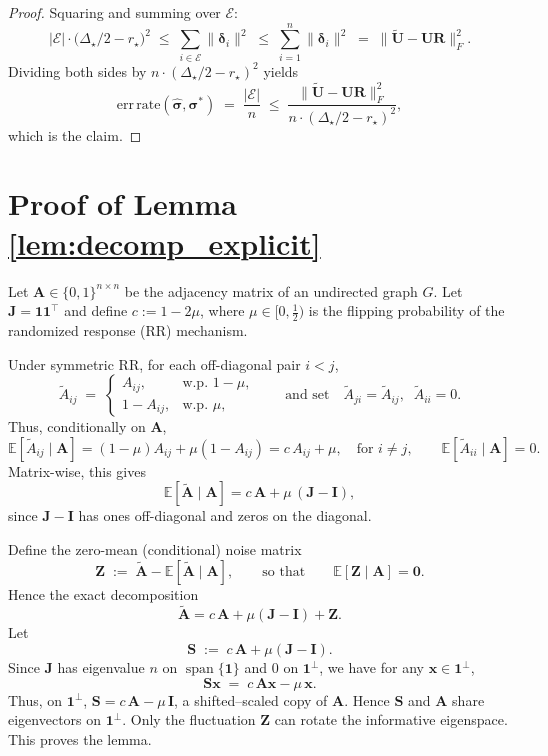 \documentclass[11pt]{article}
\theoremstyle{plain}
\theoremstyle{definition}
\theoremstyle{remark}
\begin{document}
\begin{proof}
Squaring and summing over $\mathcal{E}$:
\[
|\mathcal{E}| \cdot \bigl(\Delta_\star/2 - r_\star\bigr)^2
\;\leq\; \sum_{i \in \mathcal{E}} \|\bm\delta_i\|^2
\;\leq\; \sum_{i=1}^n \|\bm\delta_i\|^2
\;=\; \|\widetilde{\mathbf{U}} - \mathbf{U}\mathbf{R}\|_F^2.
\]
Dividing both sides by $n \cdot (\Delta_\star/2 - r_\star)^2$ yields
\[
\mathrm{err\,rate}(\hat{\bm\sigma}, \bm\sigma^\ast)
\;=\; \frac{|\mathcal{E}|}{n}
\;\leq\; \frac{\|\widetilde{\mathbf{U}} - \mathbf{U}\mathbf{R}\|_F^2}{n \cdot (\Delta_\star/2 - r_\star)^2},
\]
which is the claim.
\end{proof}



\section{Proof of Lemma \ref{lem:decomp_explicit}}

Let $\mathbf{A}\in\{0,1\}^{n\times n}$ be the adjacency matrix of an undirected graph $G$. Let $\mathbf{J}=\mathbf{1}\mathbf{1}^\top$ and define $c:=1-2\mu$, where $\mu\in[0,\tfrac12)$ is the flipping probability of the randomized response (RR) mechanism.

Under symmetric RR, for each off-diagonal pair $i<j$,
\[
\widetilde{A}_{ij} \;=\;
\begin{cases}
A_{ij}, & \text{w.p. } 1-\mu,\\
1-A_{ij}, & \text{w.p. } \mu,
\end{cases}
\qquad\text{and set}\quad \widetilde{A}_{ji}=\widetilde{A}_{ij},\;\; \widetilde{A}_{ii}=0.
\]
Thus, conditionally on $\mathbf{A}$,
\[
\mathbb{E}[\widetilde{A}_{ij}\mid \mathbf{A}]
= (1-\mu)A_{ij} + \mu(1-A_{ij})
= c\,A_{ij} + \mu,
\quad \text{for } i\neq j,
\qquad
\mathbb{E}[\widetilde{A}_{ii}\mid \mathbf{A}] = 0.
\]
Matrix-wise, this gives
\[
\mathbb{E}[\widetilde{\mathbf{A}}\mid \mathbf{A}]
= c\,\mathbf{A} + \mu\,(\mathbf{J}-\mathbf{I}),
\]
since $\mathbf{J}-\mathbf{I}$ has ones off-diagonal and zeros on the diagonal.

Define the zero-mean (conditional) noise matrix
\[
\mathbf{Z} \;:=\; \widetilde{\mathbf{A}} - \mathbb{E}[\widetilde{\mathbf{A}}\mid \mathbf{A}],
\qquad\text{so that}\qquad
\mathbb{E}[\mathbf{Z}\mid \mathbf{A}]=\mathbf{0}.
\]
Hence the exact decomposition
\[
\widetilde{\mathbf{A}}
= c\,\mathbf{A} + \mu(\mathbf{J}-\mathbf{I}) + \mathbf{Z}.
\]
Let
\[
\mathbf{S} \;:=\; c\,\mathbf{A} + \mu(\mathbf{J}-\mathbf{I}).
\]
Since $\mathbf{J}$ has eigenvalue $n$ on $\operatorname{span}\{\mathbf{1}\}$ and $0$ on $\mathbf{1}^\perp$, we have for any $\mathbf{x}\in \mathbf{1}^\perp$,
\[
\mathbf{S}\mathbf{x} \;=\; c\,\mathbf{A}\mathbf{x} - \mu\,\mathbf{x}.
\]
Thus, on $\mathbf{1}^\perp$, $\mathbf{S}=c\,\mathbf{A}-\mu\,\mathbf{I}$, a shifted--scaled copy of $\mathbf{A}$. Hence $\mathbf{S}$ and $\mathbf{A}$ share eigenvectors on $\mathbf{1}^\perp$. Only the fluctuation $\mathbf{Z}$ can rotate the informative eigenspace. This proves the lemma.
\end{document}
